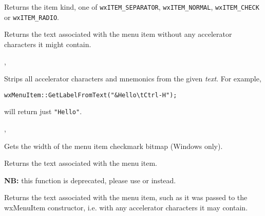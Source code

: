 Returns the item kind, one of {\tt wxITEM\_SEPARATOR}, {\tt wxITEM\_NORMAL}, 
{\tt wxITEM\_CHECK} or {\tt wxITEM\_RADIO}.

\label{wxmenuitemgetlabel}


Returns the text associated with the menu item without any accelerator
characters it might contain.


, 

\label{wxmenuitemgetlabelfromtext}


Strips all accelerator characters and mnemonics from the given {\it text}.
For example,

\begin{verbatim}
wxMenuItem::GetLabelFromText("&Hello\tCtrl-H");
\end{verbatim}

will return just {\tt "Hello"}.


, 

\label{wxmenuitemgetmarginwidth}


Gets the width of the menu item checkmark bitmap (Windows only).

\label{wxmenuitemgetname}


Returns the text associated with the menu item.

{\bf NB:} this function is deprecated, please use 
 or  
instead.

\label{wxmenuitemgettext}


Returns the text associated with the menu item, such as it was passed to the
wxMenuItem constructor, i.e. with any accelerator characters it may contain.


